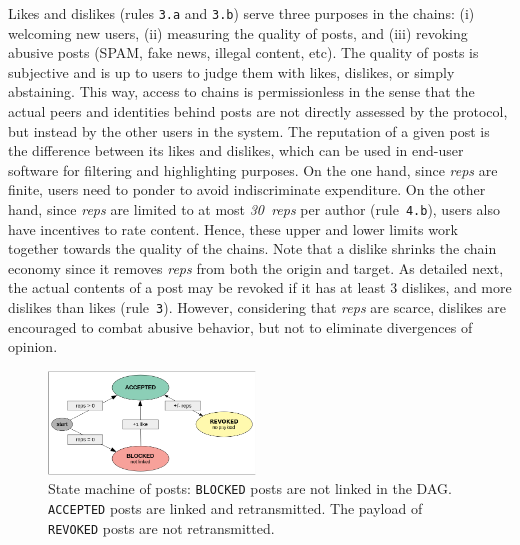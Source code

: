 \documentclass[12pt]{article}
\newcommand{\reps}     {\emph{reps}\xspace}
\newcommand{\nreps}[1] {\emph{#1~reps\xspace}}
\newcommand{\code}[1]  {\texttt{\footnotesize{#1}}}
\begin{document}
Likes and dislikes (rules \code{3.a} and \code{3.b}) serve three purposes
in the chains:
    (i) welcoming new users,
    (ii) measuring the quality of posts, and
    (iii) revoking abusive posts (SPAM, fake news, illegal content, etc).
%
The quality of posts is subjective and is up to users to judge them with likes,
dislikes, or simply abstaining.
%
This way, access to chains is permissionless in the sense that the actual peers
and identities behind posts are not directly assessed by the protocol, but
instead by the other users in the system.
%
The reputation of a given post is the difference between its likes and
dislikes, which can be used in end-user software for filtering and highlighting
purposes.
%
On the one hand, since \reps are finite, users need to ponder to avoid
indiscriminate expenditure.
On the other hand, since \reps are limited to at most \nreps{30} per author
(rule~\code{4.b}), users also have incentives to rate content.
Hence, these upper and lower limits work together towards the quality of the
chains.
%
Note that a dislike shrinks the chain economy since it removes \reps from both
the origin and target.
As detailed next, the actual contents of a post may be revoked if it has at
least 3 dislikes, and more dislikes than likes (rule~\code{3}).
However, considering that \reps are scarce, dislikes are encouraged to combat
abusive behavior, but not to eliminate divergences of opinion.

\begin{figure}
\centering
\includegraphics[width=0.49\textwidth]{state-revoked.png}
\caption{
    State machine of posts:
    \code{BLOCKED} posts are not linked in the DAG.
    \code{ACCEPTED} posts are linked and retransmitted.
    The payload of \code{REVOKED} posts are not retransmitted.
}
\label{fig.state}
\end{figure}
\end{document}
